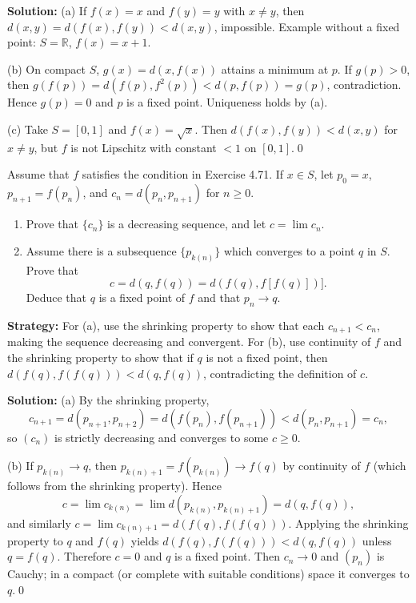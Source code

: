 \bigskip\noindent\textbf{Solution:}
(a) If $f(x)=x$ and $f(y)=y$ with $x\ne y$, then $d(x,y)=d(f(x),f(y))<d(x,y)$, impossible. Example without a fixed point: $S=\mathbb{R}$, $f(x)=x+1$.

(b) On compact $S$, $g(x)=d(x,f(x))$ attains a minimum at $p$. If $g(p)>0$, then $g(f(p))=d(f(p),f^2(p))<d(p,f(p))=g(p)$, contradiction. Hence $g(p)=0$ and $p$ is a fixed point. Uniqueness holds by (a).

(c) Take $S=[0,1]$ and $f(x)=\sqrt{x}$. Then $d(f(x),f(y))<d(x,y)$ for $x\ne y$, but $f$ is not Lipschitz with constant $<1$ on $[0,1]$.\qed



\begin{problembox}
Assume that $f$ satisfies the condition in Exercise 4.71. If $x \in S$, let $p_0 = x$, $p_{n+1} = f(p_n)$, and $c_n = d(p_n, p_{n+1})$ for $n \geq 0$.
\begin{enumerate}[label=(\alph*)]
\item Prove that $\{c_n\}$ is a decreasing sequence, and let $c = \lim c_n$.
\item Assume there is a subsequence $\{p_{k(n)}\}$ which converges to a point $q$ in $S$. Prove that
\[c = d(q, f(q)) = d(f(q), f[f(q)])].\]
Deduce that $q$ is a fixed point of $f$ and that $p_n \to q$.
\end{enumerate}
\end{problembox}

\noindent\textbf{Strategy:} For (a), use the shrinking property to show that each $c_{n+1} < c_n$, making the sequence decreasing and convergent. For (b), use continuity of $f$ and the shrinking property to show that if $q$ is not a fixed point, then $d(f(q), f(f(q))) < d(q, f(q))$, contradicting the definition of $c$.

\bigskip\noindent\textbf{Solution:}
(a) By the shrinking property,
\[
c_{n+1}=d(p_{n+1},p_{n+2})=d(f(p_n),f(p_{n+1}))<d(p_n,p_{n+1})=c_n,
\]
so $(c_n)$ is strictly decreasing and converges to some $c\ge 0$.

(b) If $p_{k(n)}\to q$, then $p_{k(n)+1}=f(p_{k(n)})\to f(q)$ by continuity of $f$ (which follows from the shrinking property). Hence
\[
c=\lim c_{k(n)}=\lim d(p_{k(n)},p_{k(n)+1})=d(q,f(q)),
\]
and similarly $c=\lim c_{k(n)+1}=d(f(q),f(f(q)))$. Applying the shrinking property to $q$ and $f(q)$ yields $d(f(q),f(f(q)))<d(q,f(q))$ unless $q=f(q)$. Therefore $c=0$ and $q$ is a fixed point. Then $c_n\to 0$ and $(p_n)$ is Cauchy; in a compact (or complete with suitable conditions) space it converges to $q$.\qed

